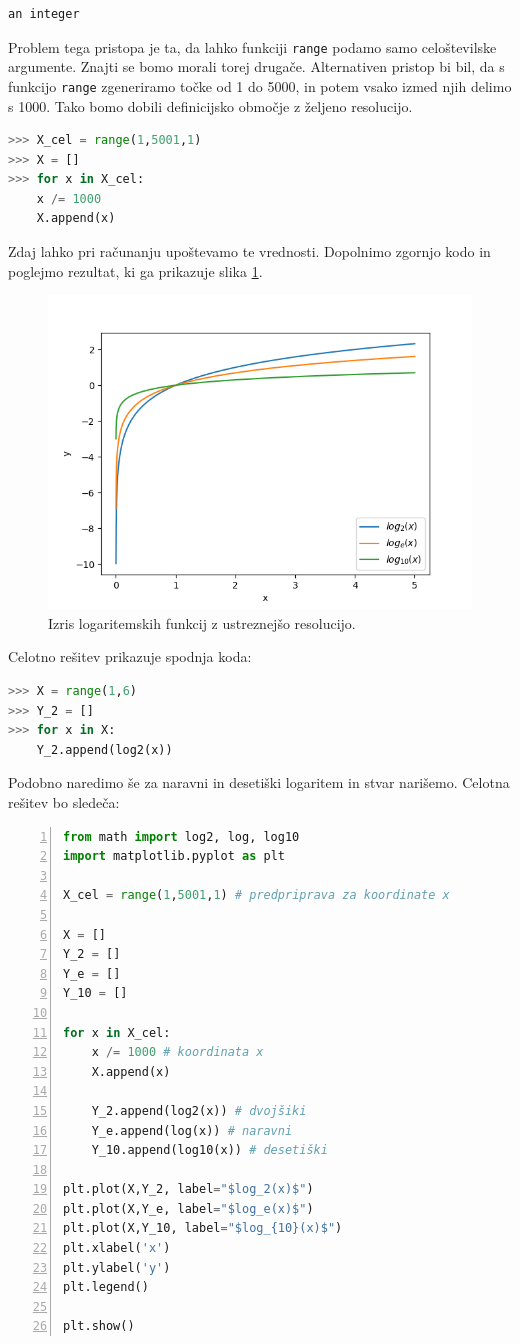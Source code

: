 \begin{resitev}
\begin{lstlisting}[language=Python]
an integer
\end{lstlisting}
Problem tega pristopa je ta, da lahko funkciji \texttt{range} podamo samo celoštevilske argumente. Znajti se bomo morali torej drugače. Alternativen pristop bi bil, da s funkcijo \texttt{range} zgeneriramo točke od 1 do 5000, in potem vsako izmed njih delimo s 1000. Tako bomo dobili definicijsko območje z željeno resolucijo. 
\begin{lstlisting}[language=Python]
>>> X_cel = range(1,5001,1)
>>> X = []
>>> for x in X_cel:
	x /= 1000
	X.append(x)
\end{lstlisting}
Zdaj lahko pri računanju upoštevamo te vrednosti. Dopolnimo zgornjo kodo in poglejmo rezultat, ki ga prikazuje slika \ref{img:plt9}.
\begin{figure}
    \includegraphics[width=\linewidth]{img/plt9.png}
    \caption{Izris logaritemskih funkcij z ustreznejšo resolucijo.}
    \label{img:plt9}
\end{figure}
Celotno rešitev prikazuje spodnja koda:
\begin{lstlisting}[language=Python]
>>> X = range(1,6)
>>> Y_2 = []
>>> for x in X:
    Y_2.append(log2(x))
\end{lstlisting}
Podobno naredimo še za naravni in desetiški logaritem in stvar narišemo. Celotna rešitev bo sledeča:
\begin{lstlisting}[language=Python,numbers=left]
from math import log2, log, log10
import matplotlib.pyplot as plt

X_cel = range(1,5001,1) # predpriprava za koordinate x

X = []
Y_2 = []
Y_e = []
Y_10 = []

for x in X_cel:
    x /= 1000 # koordinata x
    X.append(x)
    
    Y_2.append(log2(x)) # dvojšiki
    Y_e.append(log(x)) # naravni
    Y_10.append(log10(x)) # desetiški

plt.plot(X,Y_2, label="$log_2(x)$")
plt.plot(X,Y_e, label="$log_e(x)$")
plt.plot(X,Y_10, label="$log_{10}(x)$")
plt.xlabel('x')
plt.ylabel('y')
plt.legend()

plt.show()
\end{lstlisting}

\end{resitev}
